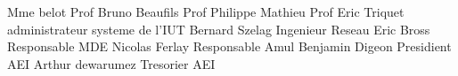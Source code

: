 
Mme belot Prof
Bruno Beaufils Prof
Philippe Mathieu Prof
Eric Triquet  administrateur systeme de l'IUT
Bernard Szelag Ingenieur Reseau
Eric Bross Responsable MDE
Nicolas Ferlay Responsable Amul
Benjamin Digeon Presidient AEI
Arthur dewarumez Tresorier AEI
